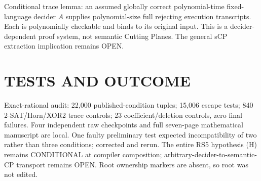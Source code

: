 \documentclass{article}
\begin{document}
Conditional trace lemma: an assumed globally correct polynomial-time fixed-language decider $A$ supplies polynomial-size full rejecting execution transcripts. Each is polynomially checkable and binds to its original input. This is a decider-dependent proof system, not semantic Cutting Planes. The general sCP extraction implication remains OPEN.
\section{TESTS AND OUTCOME}
Exact-rational audit: 22,000 published-condition tuples; 15,006 escape tests; 840 2-SAT/Horn/XOR2 trace controls; 23 coefficient/deletion controls, zero final failures. Four independent raw checkpoints and full seven-page mathematical manuscript are local. One faulty preliminary test expected incompatibility of two rather than three conditions; corrected and rerun. The entire RS5 hypothesis (H) remains CONDITIONAL at compiler composition; arbitrary-decider-to-semantic-CP transport remains OPEN. Root ownership markers are absent, so root was not edited.
\end{document}
